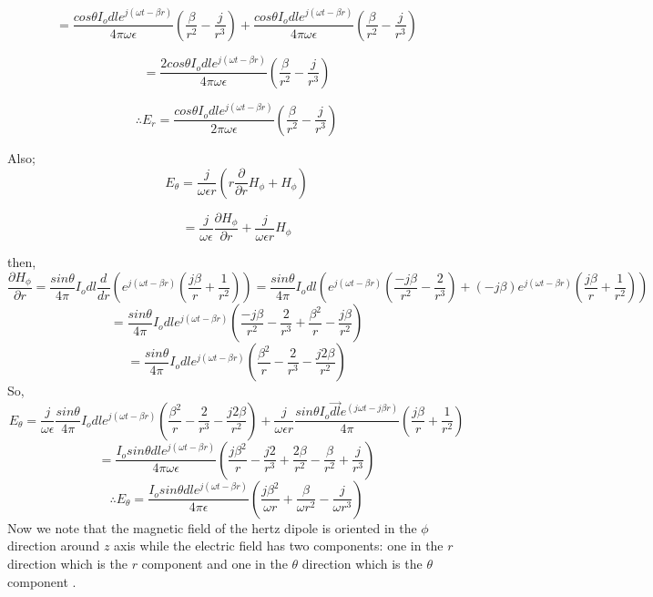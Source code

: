 $$ = \dfrac{cos \theta I_o dl e^{j(\omega t-\beta r)} }{4\pi \omega  \epsilon} \left(\dfrac{\beta}{r^2} - \dfrac{j}{r^3}\right) + \dfrac{cos \theta I_o dl e^{j(\omega t-\beta r)} }{4\pi \omega \epsilon} \left(\dfrac{\beta}{r^2} - \dfrac{j}{r^3}\right) $$

$$ = \dfrac{2 cos \theta I_o dl e^{j(\omega t-\beta r)} }{4\pi \omega\epsilon} \left(\dfrac{\beta}{r^2} - \dfrac{j}{r^3}\right) $$
 
\begin{equation}
\therefore E_r = \dfrac{cos \theta I_o dl e^{j(\omega t-\beta r)} }{2\pi \omega \epsilon} \left(\dfrac{\beta}{r^2} - \dfrac{j}{r^3}\right)
\end{equation}
 
Also; 
$$ E_{\theta} = \dfrac{j}{\omega\epsilon r}\left(r\dfrac{\partial}{\partial r}H_{\phi} + H_{\phi}\right)$$ 

$$ =  \dfrac{j}{\omega \epsilon}\dfrac{\partial H_{\phi}}{\partial r} + \dfrac{j }{\omega \epsilon r}H_{\phi}$$

then,
\begin{dmath*}
\dfrac{\partial H_{\phi}}{\partial r} = \dfrac{sin \theta}{4 \pi} I_o dl \dfrac{d}{dr}\left(e^{j(\omega t - \beta r)}\left(\dfrac{j \beta}{r} + \dfrac{1}{r^2}\right)\right) = \dfrac{sin \theta}{4 \pi} I_o dl \left(e^{j(\omega t - \beta r)}\left(\dfrac{-j\beta}{r^2} - \dfrac{2}{r^3}\right) + (-j\beta)e^{j(\omega t - \beta r)}\left(\dfrac{j \beta}{r} + \dfrac{1}{r^2}\right)\right)
\end{dmath*}
$$ = \dfrac{sin \theta}{4 \pi} I_o dle^{j(\omega t - \beta r)} \left(\dfrac{-j\beta}{r^2} - \dfrac{2}{r^3} + \dfrac{\beta^2}{r} - \dfrac{j\beta}{r^2}\right)$$
$$ = \dfrac{sin \theta}{4 \pi} I_o dle^{j(\omega t - \beta r)} \left( \dfrac{\beta^2}{r} - \dfrac{2}{r^3}  - \dfrac{j2\beta}{r^2}\right)$$
So,
\begin{dmath*}
 E_{\theta} =  \dfrac{j}{\omega\epsilon}\dfrac{sin \theta}{4 \pi} I_o dle^{j(\omega t - \beta r)}\left( \dfrac{\beta^2}{r} - \dfrac{2}{r^3}  - \dfrac{j2\beta}{r^2}\right) + \dfrac{j}{\omega \epsilon r}\dfrac{sin\theta I_o\vec{dl} e^{(j\omega t-j\beta r)} }{4\pi} \left(\dfrac{j\beta}{r} + \dfrac{1}{r^2}\right)
\end{dmath*}
$$ = \dfrac{I_osin \theta dl e^{j(\omega t - \beta r)}}{4\pi \omega\epsilon}\left(\dfrac{j\beta^2}{r} - \dfrac{j2}{r^3} + \dfrac{2\beta}{r^2} - \dfrac{\beta}{r^2} + \dfrac{j}{r^3}\right)$$
\begin{equation}
\therefore E_{\theta} = \dfrac{I_osin \theta dl e^{j(\omega t - \beta r)}}{4\pi \epsilon}\left(\dfrac{j\beta^2}{\omega r} + \dfrac{\beta}{\omega r^2} - \dfrac{j}{\omega r^3}\right)
\end{equation}
Now we note that the magnetic field of the hertz dipole is oriented in the $\phi$ direction around $z$ axis while the electric field has two components: one in the $r$ direction which is the $r$ component and one in the $\theta$ direction which is the $\theta$ component .

